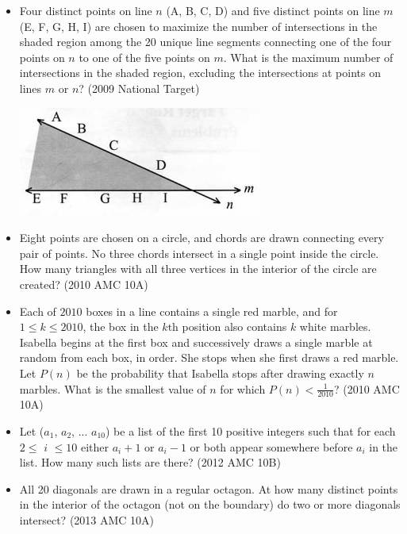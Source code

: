 \documentclass{article}
\begin{document}
\begin{itemize}

\item Four distinct points on line $n$ (A, B, C, D) and five distinct points on line $m$ (E, F, G, H, I) are chosen to maximize the number of intersections in the shaded region among the 20 unique line segments connecting one of the four points on $n$ to one of the five points on $m$. What is the maximum number of intersections in the shaded region, excluding the intersections at points on lines $m$ or $n$? (2009 National Target)

\centerline{\includegraphics{20095.png}}

\item Eight points are chosen on a circle, and chords are drawn connecting every pair of points. No three chords intersect in a single point inside the circle. How many triangles with all three vertices in the interior of the circle are created? (2010 AMC 10A)

\item Each of $2010$ boxes in a line contains a single red marble, and for $1 \le k \le 2010$, the box in the $k\text{th}$ position also contains $k$ white marbles. Isabella begins at the first box and successively draws a single marble at random from each box, in order. She stops when she first draws a red marble. Let $P(n)$ be the probability that Isabella stops after drawing exactly $n$ marbles. What is the smallest value of $n$ for which $P(n) < \frac{1}{2010}$? (2010 AMC 10A)

\item Let ($a_1$, $a_2$, ... $a_{10}$) be a list of the first 10 positive integers such that for each $2\le$ $i$ $\le10$ either $a_i + 1$ or $a_i-1$ or both appear somewhere before $a_i$ in the list. How many such lists are there? (2012 AMC 10B)

\item All 20 diagonals are drawn in a regular octagon. At how many distinct points in the interior
of the octagon (not on the boundary) do two or more diagonals intersect? (2013 AMC 10A)


\end{itemize}
\end{document}
